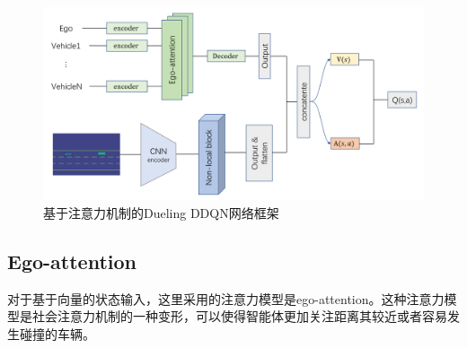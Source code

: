\documentclass[letterpaper, 10 pt, conference]{ieeeconf}  %
\begin{document}
\begin{figure}[htbp]
    \centering
    \includegraphics[width=\linewidth]{fig/总体架构.png}
    \caption{基于注意力机制的Dueling DDQN网络框架\cite{wang2021highway}}
    \label{fig:总体架构}
  \end{figure}

\subsection{Ego-attention}
对于基于向量的状态输入，这里采用的注意力模型是ego-attention\cite{leurent2019social}。这种注意力模型是社会注意力机制的一种变形，可以使得智能体更加关注距离其较近或者容易发生碰撞的车辆。
\end{document}

